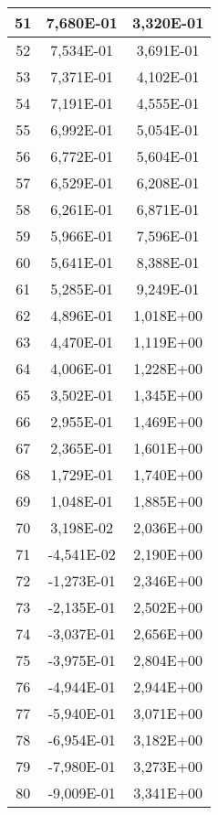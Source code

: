 \documentclass[12pt]{article}
\begin{document}
\begin{center}
\begin{longtable}{|c|c|c|}
    51	&     7,680E-01	&   3,320E-01 \\ \hline
    52	&     7,534E-01	&   3,691E-01 \\ \hline
    53	&     7,371E-01	&   4,102E-01 \\ \hline
    54	&     7,191E-01	&   4,555E-01 \\ \hline
    55	&     6,992E-01	&   5,054E-01 \\ \hline
    56	&     6,772E-01	&   5,604E-01 \\ \hline
    57	&     6,529E-01	&   6,208E-01 \\ \hline
    58	&     6,261E-01	&   6,871E-01 \\ \hline
    59	&     5,966E-01	&   7,596E-01 \\ \hline
    60	&     5,641E-01	&   8,388E-01 \\ \hline
    61	&     5,285E-01	&   9,249E-01 \\ \hline
    62	&     4,896E-01	&   1,018E+00 \\ \hline
    63	&     4,470E-01	&   1,119E+00 \\ \hline
    64	&     4,006E-01	&   1,228E+00 \\ \hline
    65	&     3,502E-01	&   1,345E+00 \\ \hline
    66	&     2,955E-01	&   1,469E+00 \\ \hline
    67	&     2,365E-01	&   1,601E+00 \\ \hline
    68	&     1,729E-01	&   1,740E+00 \\ \hline
    69	&     1,048E-01	&   1,885E+00 \\ \hline
    70	&     3,198E-02	&   2,036E+00 \\ \hline
    71	&     -4,541E-02	&   2,190E+00 \\ \hline
    72	&     -1,273E-01	&   2,346E+00 \\ \hline
    73	&     -2,135E-01	&   2,502E+00 \\ \hline
    74	&     -3,037E-01	&   2,656E+00 \\ \hline
    75	&     -3,975E-01	&   2,804E+00 \\ \hline
    76	&     -4,944E-01	&   2,944E+00 \\ \hline
    77	&     -5,940E-01	&   3,071E+00 \\ \hline
    78	&     -6,954E-01	&   3,182E+00 \\ \hline
    79	&     -7,980E-01	&   3,273E+00 \\ \hline
    80	&     -9,009E-01	&   3,341E+00 \\ \hline

\end{longtable}
\end{center}
\end{document}
